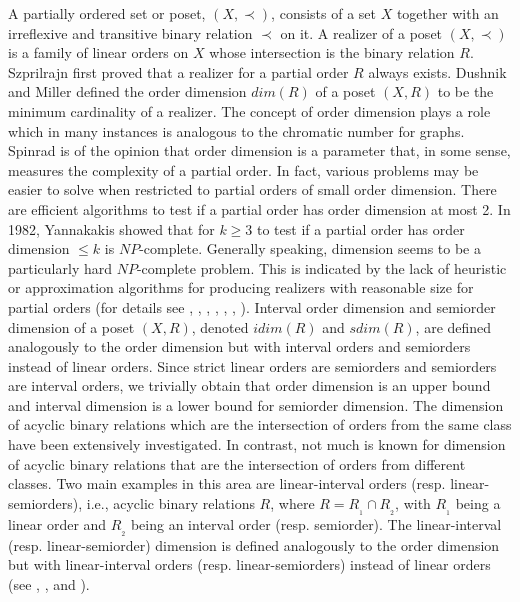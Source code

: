 \documentclass{article}
\theoremstyle{definition}
\begin{document}
A partially ordered set or poset, $(X,\prec)$, consists of a set $X$ together with an irreflexive and transitive binary relation $\prec$ on it. A realizer of a poset $(X,\prec)$ is a family of linear orders on $X$ whose intersection is
the binary relation $R$. Szprilrajn \cite{szp} first proved that a realizer for a partial order $R$ always exists.
Dushnik and Miller \cite{DM} defined the order dimension $dim(R)$ of a poset $(X,R)$ to be the minimum cardinality of a realizer. 
The concept of order dimension plays a role which in many instances is analogous to the chromatic number for graphs.
Spinrad \cite{spi} is of the opinion that order dimension is a parameter that, in some sense, measures 
the complexity of a partial order.
In fact, various problems may be easier to solve when restricted to partial orders of small order dimension.
There are efficient algorithms to test if a partial order has order dimension at most 2. In 1982, 
Yannakakis \cite {yan} showed that for $k\geq 3$ to test if a partial order has order dimension $\leq k$ is $NP$-complete.
Generally speaking,
dimension seems to be a particularly hard $NP$-complete problem. 
This is indicated by the lack of heuristic or approximation algorithms for producing realizers with 
reasonable size for partial orders (for details see  \cite{FMP}, \cite{EPL}, \cite{MS}, \cite{spi}, \cite{sta} , \cite{tro1}, \cite{yan}).
Interval order dimension and semiorder dimension of a poset $(X,R)$, denoted
$idim(R)$ and $sdim(R)$,
are defined analogously to the order dimension but with interval orders and semiorders instead of linear orders.
Since strict linear orders are semiorders and semiorders are interval orders, we trivially obtain that order dimension 
is an upper bound and interval dimension is a lower bound for semiorder dimension. The dimension of 
acyclic binary relations which are the intersection of orders from the same class have been 
extensively investigated.
In contrast, not much is known for dimension of acyclic binary relations 
that are the intersection of orders from different classes. Two main examples 
in this area are
linear-interval orders (resp. linear-semiorders), i.e., acyclic binary relations $R$, where $R=R_{_1}\cap R_{_2}$, 
with $R_{_1}$ being a linear order and $R_{_2}$ being an interval order (resp. semiorder).
The linear-interval (resp. linear-semiorder) dimension
is defined analogously to the order dimension but with linear-interval orders (resp. linear-semiorders) instead 
of linear orders (see \cite{mer}, \cite{rav}, \cite{tak0} and \cite{tak1}).
\end{document}
